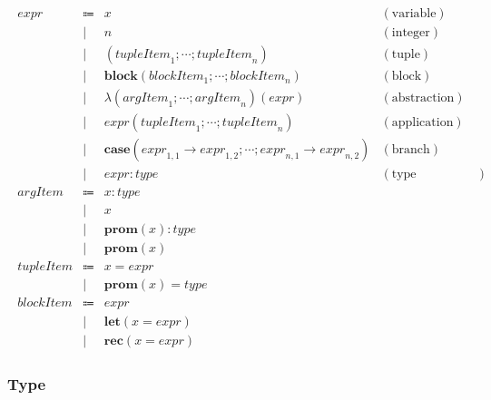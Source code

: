 \begin{align*}
  \begin{array}{rclr}
  \mathit{expr}
  & \Coloneq & x &(\text{variable}) \\
  & \mid & n &(\text{integer}) \\
  & \mid & (\mathit{tupleItem}_1; \cdots; \mathit{tupleItem}_n) &(\text{tuple}) \\
  & \mid & \mathbf{block}(\mathit{blockItem}_1; \cdots; \mathit{blockItem}_n) &(\text{block}) \\
  & \mid & \lambda(\mathit{argItem}_1; \cdots; \mathit{argItem}_n)(\mathit{expr}) &(\text{abstraction}) \\
  & \mid & \mathit{expr}(\mathit{tupleItem}_1; \cdots; \mathit{tupleItem}_n) &(\text{application}) \\
  & \mid & \mathbf{case}(\mathit{expr}_{1,1} \rightarrow \mathit{expr}_{1,2}; \cdots; \mathit{expr}_{n,1} \rightarrow \mathit{expr}_{n,2}) &(\text{branch}) \\
  & \mid & \mathit{expr}: \mathit{type} &(\text{type annotation}) \\
  \mathit{argItem}
  & \Coloneq & x: \mathit{type} \\
  & \mid & x \\
  & \mid & \mathbf{prom}(x): \mathit{type} \\
  & \mid & \mathbf{prom}(x) \\
  \mathit{tupleItem}
  & \Coloneq & x = \mathit{expr} \\
  & \mid & \mathbf{prom}(x) = \mathit{type} \\
  \mathit{blockItem}
  & \Coloneq & \mathit{expr} \\
  & \mid & \mathbf{let}(x = \mathit{expr}) \\
  & \mid & \mathbf{rec}(x = \mathit{expr})
  \end{array}
\end{align*}

\subsubsection{Type}

